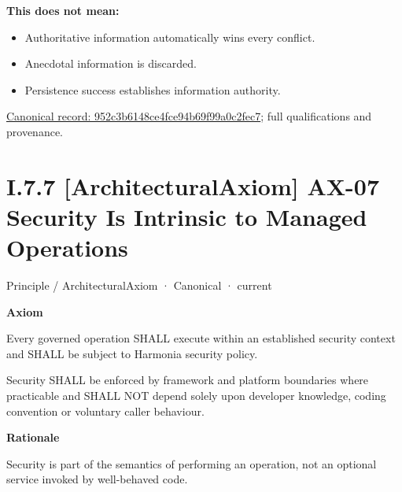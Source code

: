 \textbf{This does not mean:}



\begin{itemize}


\item Authoritative information automatically wins every conflict.

\item Anecdotal information is discarded.

\item Persistence success establishes information authority.

\end{itemize}

{\footnotesize \href{../../../../../../../continuum/motivation/principle/952c3b6148ce4fce94b69f99a0c2fec7.md}{Canonical record: 952c3b6148ce4fce94b69f99a0c2fec7}; full qualifications and provenance.}\par
\section*{I.7.7 [ArchitecturalAxiom] AX-07 Security Is Intrinsic to Managed Operations}
\label{navigation:I.7.7}

\label{element:5de2ae2c3b794c2d9f3a14efd51d564f}
{\small Principle / ArchitecturalAxiom · Canonical · current}\par

\par\medskip\textbf{Axiom}\par


Every governed operation SHALL execute within an established security
context and SHALL be subject to Harmonia security policy.



Security SHALL be enforced by framework and platform boundaries where
practicable and SHALL NOT depend solely upon developer knowledge, coding
convention or voluntary caller behaviour.



\par\medskip\textbf{Rationale}\par


Security is part of the semantics of performing an operation, not an
optional service invoked by well-behaved code.



